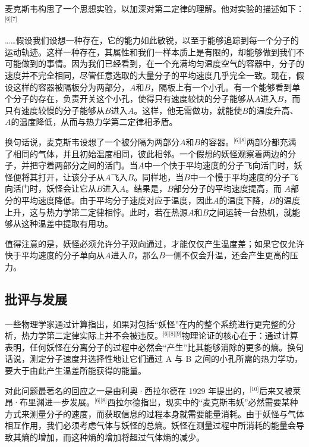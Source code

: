 麦克斯韦构思了一个思想实验，以加深对第二定律的理解。他对实验的描述如下：\(^\text{[6][7]}\)

……假设我们设想一种存在，它的能力如此敏锐，以至于能够追踪到每一个分子的运动轨迹。这样一种存在，其属性和我们一样本质上是有限的，却能够做到我们不可能做到的事情。因为我们已经看到，在一个充满均匀温度空气的容器中，分子的速度并不完全相同，尽管任意选取的大量分子的平均速度几乎完全一致。现在，假设这样的容器被隔板分为两部分，$A$和$B$，隔板上有一个小孔。有一个能够看到单个分子的存在，负责开关这个小孔，使得只有速度较快的分子能够从$A$进入$B$，而只有速度较慢的分子能够从$B$进入$A$。这样，他无需做功，就能使$B$的温度升高、$A$的温度降低，从而与热力学第二定律相矛盾。

换句话说，麦克斯韦设想了一个被分隔为两部分$A$和$B$的容器。\(^\text{[6][8]}\)两部分都充满了相同的气体，并且初始温度相同，彼此相邻。一个假想的妖怪观察着两边的分子，并把守着两部分之间的活门。当$A$中一个快于平均速度的分子飞向活门时，妖怪便将其打开，让该分子从$A$飞入$B$。同样地，当$B$中一个慢于平均速度的分子飞向活门时，妖怪会让它从$B$进入$A$。结果是，$B$部分分子的平均速度提高，而 $A$部分的平均速度降低。由于平均分子速度对应于温度，因此$A$的温度下降，$B$的温度上升，这与热力学第二定律相悖。此时，若在热源$A$和$B$之间运转一台热机，就能够从这种温差中提取有用功。

值得注意的是，妖怪必须允许分子双向通过，才能仅仅产生温度差；如果它仅允许快于平均速度的分子单向从$A$进入$B$，那么$B$一侧不仅会升温，还会产生更高的压力。
\subsection{批评与发展}
一些物理学家通过计算指出，如果对包括“妖怪”在内的整个系统进行更完整的分析，热力学第二定律实际上并不会被违反。\(^\text{[6][8][9]}\)物理论证的核心在于：通过计算表明，任何妖怪在分离分子的过程中必然会“产生”比其能够消除的更多的熵。换句话说，测定分子速度并选择性地让它们通过 A 与 B 之间的小孔所需的热力学功，要大于由此产生温差所能获得的能量。

对此问题最著名的回应之一是由利奥·西拉尔德在 1929 年提出的，\(^\text{[10]}\)后来又被莱昂·布里渊进一步发展。\(^\text{[6][8]}\)西拉尔德指出，现实中的“麦克斯韦妖”必然需要某种方式来测量分子的速度，而获取信息的过程本身就需要能量消耗。由于妖怪与气体相互作用，我们必须考虑气体与妖怪的总熵。妖怪在测量过程中所消耗的能量会导致其熵的增加，而这种熵的增加将超过气体熵的减少。

